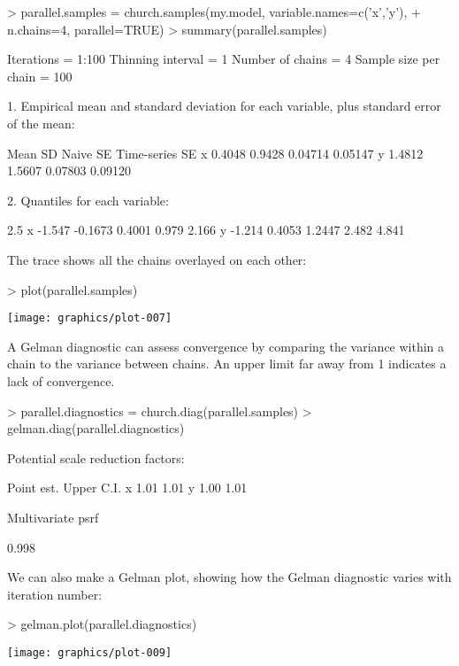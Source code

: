 \documentclass[12pt]{article}
\begin{document}
\begin{Schunk}
\begin{Sinput}
> parallel.samples = church.samples(my.model, variable.names=c('x','y'), 
+   n.chains=4, parallel=TRUE)
> summary(parallel.samples)
\end{Sinput}
\begin{Soutput}
Iterations = 1:100
Thinning interval = 1 
Number of chains = 4 
Sample size per chain = 100 

1. Empirical mean and standard deviation for each variable,
   plus standard error of the mean:

    Mean     SD Naive SE Time-series SE
x 0.4048 0.9428  0.04714        0.05147
y 1.4812 1.5607  0.07803        0.09120

2. Quantiles for each variable:

    2.5%     25%    50%   75% 97.5%
x -1.547 -0.1673 0.4001 0.979 2.166
y -1.214  0.4053 1.2447 2.482 4.841
\end{Soutput}
\end{Schunk}

The trace shows all the chains overlayed on each other:

\begin{Schunk}
\begin{Sinput}
> plot(parallel.samples)
\end{Sinput}
\end{Schunk}
\texttt{[image: graphics/plot-007]}

A Gelman diagnostic can assess convergence by comparing the variance within a chain to the variance between chains. An upper limit far away from 1 indicates a lack of convergence.
\begin{Schunk}
\begin{Sinput}
> parallel.diagnostics = church.diag(parallel.samples)
> gelman.diag(parallel.diagnostics)
\end{Sinput}
\begin{Soutput}
Potential scale reduction factors:

  Point est. Upper C.I.
x       1.01       1.01
y       1.00       1.01

Multivariate psrf

0.998
\end{Soutput}
\end{Schunk}

We can also make a Gelman plot, showing how the Gelman diagnostic varies with iteration number:
\begin{center}
\begin{Schunk}
\begin{Sinput}
> gelman.plot(parallel.diagnostics)
\end{Sinput}
\end{Schunk}
\texttt{[image: graphics/plot-009]}
\end{center}
\end{document}
